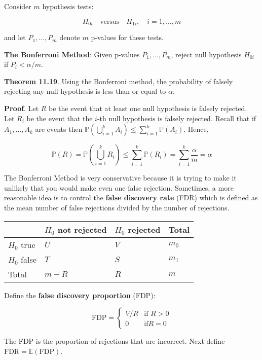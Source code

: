 Consider \(m\) hypothesis tests:

\[ H_{0i} \quad \text{versus} \quad H_{1i}, \quad i = 1, \dots, m\]

and let \(P_1, \dots, P_m\) denote \(m\) p-values for these tests.

\textbf{The Bonferroni Method}: Given p-values \(P_1, \dots, P_m\),
reject null hypothesis \(H_{0i}\) if \(P_i < \alpha / m\).

\textbf{Theorem 11.19}. Using the Bonferroni method, the probability of
falsely rejecting any null hypothesis is less than or equal to
\(\alpha\).

\textbf{Proof}. Let \(R\) be the event that at least one null hypothesis
is falsely rejected. Let \(R_i\) be the event that the \(i\)-th null
hypothesis is falsely rejected. Recall that if \(A_1, \dots, A_k\) are
events then
\(\mathbb{P} \left( \bigcup_{i=1}^k A_i \right) \leq \sum_{i=1}^k \mathbb{P}(A_i)\).
Hence,

\[\mathbb{P}(R) = \mathbb{P}\left( \bigcup_{i=1}^k R_i \right) \leq \sum_{i=1}^k \mathbb{P}(R_i) = \sum_{i=1}^k \frac{\alpha}{m} = \alpha\]

The Bonferroni Method is very conservative because it is trying to make
it unlikely that you would make even one false rejection. Sometimes, a
more reasonable idea is to control the \textbf{false discovery rate}
(FDR) which is defined as the mean number of false rejections divided by
the number of rejections.

\begin{longtable}[]{@{}llll@{}}
\toprule\noalign{}
& \(H_0\) not rejected & \(H_0\) rejected & Total \\
\midrule\noalign{}
\endhead
\bottomrule\noalign{}
\endlastfoot
\(H_0\) true & \(U\) & \(V\) & \(m_0\) \\
\(H_0\) false & \(T\) & \(S\) & \(m_1\) \\
Total & \(m - R\) & \(R\) & \(m\) \\
\end{longtable}

Define the \textbf{false discovery proportion} (FDP):

\[ \text{FDP} = \begin{cases}
V / R & \text{if } R > 0\\
0     & \text{if}  R = 0
\end{cases}\]

The FDP is the proportion of rejections that are incorrect. Next define
\(\text{FDR} = \mathbb{E}(\text{FDP})\).

